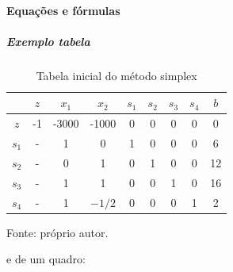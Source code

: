 \documentclass[12pt, a4paper]{article}
\begin{document}
        \paragraph{Equações e fórmulas}
        
        \subparagraph{Exemplo tabela}
            
            \begin{table}[H]
                \centering
                \caption{Tabela inicial do método simplex}
                \begin{tabular}{|c|c|c|c|c|c|c|c|c|}
                    \hline
                            & $z$   & $x_1$ & $x_2$ & $s_1$ & $s_2$ & $s_3$ & $s_4$ & $b$   \\ \hline
                    $z$     & -1    & -3000 & -1000 & 0     & 0     & 0     & 0     & 0     \\ \hline
                    $s_1$   & -     & 1     & 0     & 1     & 0     & 0     & 0     & 6     \\ \hline
                    $s_2$   & -     & 0     & 1     & 0     & 1     & 0     & 0     & 12    \\ \hline
                    $s_3$   & -     & 1     & 1     & 0     & 0     & 1     & 0     & 16    \\ \hline
                    $s_4$   & -     & 1     & $-1/2$& 0     & 0     & 0     & 1     & 2     \\ \hline
                \end{tabular}
                \par \footnotesize Fonte: próprio autor.
                \label{tab:5_4-tabela_inicial}
            \end{table}
        
            e de um quadro:
\end{document}
